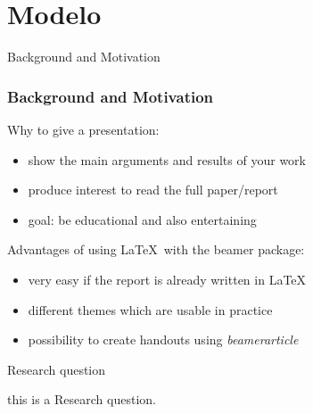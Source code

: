 \section{Modelo}
\begin{frame}{Background and Motivation}
    \frametitle<presentation>{Background and Motivation}
    \begin{block}{Why to give a presentation:}
        \begin{itemize}
            \item show the main arguments and results of your work
            \item produce interest to read the full paper/report
            \item goal: be educational and also entertaining
        \end{itemize}
    \end{block}
    \begin{block}{Advantages of using \LaTeX ~with the beamer package:}
        \begin{itemize}
            \item very easy if the report is already written in \LaTeX
            \item different themes which are usable in practice
            \item possibility to create handouts using \emph{beamerarticle}
        \end{itemize}
    \end{block}
\end{frame}

\begin{frame}{Research question}

    this is a Research question.

\end{frame}
